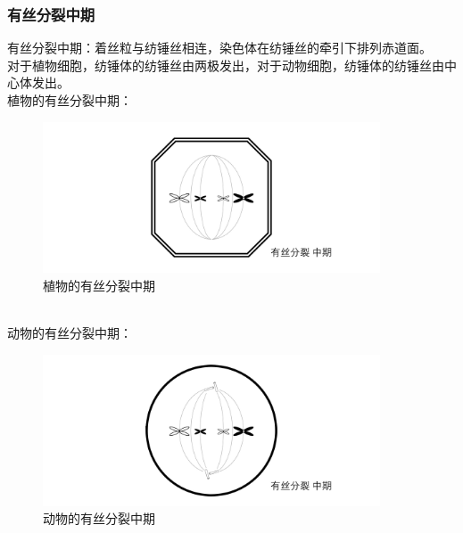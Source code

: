 \documentclass[UTF8]{ctexart}
\begin{document}
\subsubsection{有丝分裂中期}
    有丝分裂中期：着丝粒与纺锤丝相连，染色体在纺锤丝的牵引下排列赤道面。\\[3mm]
    对于植物细胞，纺锤体的纺锤丝由两极发出，对于动物细胞，纺锤体的纺锤丝由中心体发出。\\[6mm]
    植物的有丝分裂中期：
    \begin{figure}[h]
        \begin{center}
            \includegraphics[width=10cm]{BiologyImage/26.jpg}
            \caption{植物的有丝分裂中期}
        \end{center}
    \end{figure}\\
    动物的有丝分裂中期：
    \begin{figure}[h]
        \begin{center}
            \includegraphics[width=10cm]{BiologyImage/31.jpg}
            \caption{动物的有丝分裂中期}
        \end{center}
    \end{figure}\\

\newpage
\end{document}
